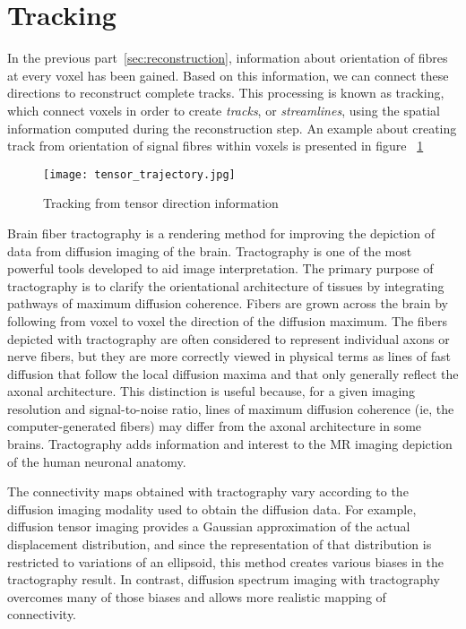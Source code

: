 

\section{Tracking}
In the previous part~\ref{sec:reconstruction}, information about orientation of fibres at every voxel has been gained. Based on this information, we can connect these directions to reconstruct complete tracks. This processing is known as tracking, which connect voxels in order to create \emph{tracks}, or \emph{streamlines}, using the spatial information computed during the reconstruction step. An example about creating track from orientation of signal fibres within voxels is presented in figure ~\ref{Fig:tracking}

\begin{figure} 
  \centering 
  \texttt{[image: tensor\_trajectory.jpg]}
  \caption{Tracking from tensor direction information}
  \label{Fig:tracking}
\end{figure}

Brain fiber tractography is a rendering method for improving the depiction of data from diffusion imaging of the brain. Tractography is one of the most powerful tools developed to aid image interpretation. The primary purpose of tractography is to clarify the orientational architecture of tissues by integrating pathways of maximum diffusion coherence. Fibers are grown across the brain by following from voxel to voxel the direction of the diffusion maximum. The fibers depicted with tractography are often considered to represent individual axons or nerve fibers, but they are more correctly viewed in physical terms as lines of fast diffusion that follow the local diffusion maxima and that only generally reflect the axonal architecture. This distinction is useful because, for a given imaging resolution and signal-to-noise ratio, lines of maximum diffusion coherence (ie, the computer-generated fibers) may differ from the axonal architecture in some brains. Tractography adds information and interest to the MR imaging depiction of the human neuronal anatomy.

The connectivity maps obtained with tractography vary according to the diffusion imaging modality used to obtain the diffusion data. For example, diffusion tensor imaging provides a Gaussian approximation of the actual displacement distribution, and since the representation of that distribution is restricted to variations of an ellipsoid, this method creates various biases in the tractography result. In contrast, diffusion spectrum imaging with tractography overcomes many of those biases and allows more realistic mapping of connectivity. 

